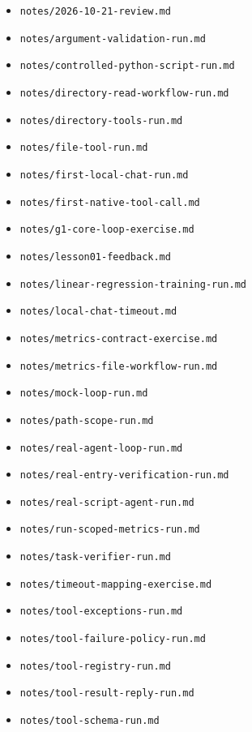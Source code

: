 \begin{itemize}
\item \nolinkurl{notes/2026-10-21-review.md}
\item \nolinkurl{notes/argument-validation-run.md}
\item \nolinkurl{notes/controlled-python-script-run.md}
\item \nolinkurl{notes/directory-read-workflow-run.md}
\item \nolinkurl{notes/directory-tools-run.md}
\item \nolinkurl{notes/file-tool-run.md}
\item \nolinkurl{notes/first-local-chat-run.md}
\item \nolinkurl{notes/first-native-tool-call.md}
\item \nolinkurl{notes/g1-core-loop-exercise.md}
\item \nolinkurl{notes/lesson01-feedback.md}
\item \nolinkurl{notes/linear-regression-training-run.md}
\item \nolinkurl{notes/local-chat-timeout.md}
\item \nolinkurl{notes/metrics-contract-exercise.md}
\item \nolinkurl{notes/metrics-file-workflow-run.md}
\item \nolinkurl{notes/mock-loop-run.md}
\item \nolinkurl{notes/path-scope-run.md}
\item \nolinkurl{notes/real-agent-loop-run.md}
\item \nolinkurl{notes/real-entry-verification-run.md}
\item \nolinkurl{notes/real-script-agent-run.md}
\item \nolinkurl{notes/run-scoped-metrics-run.md}
\item \nolinkurl{notes/task-verifier-run.md}
\item \nolinkurl{notes/timeout-mapping-exercise.md}
\item \nolinkurl{notes/tool-exceptions-run.md}
\item \nolinkurl{notes/tool-failure-policy-run.md}
\item \nolinkurl{notes/tool-registry-run.md}
\item \nolinkurl{notes/tool-result-reply-run.md}
\item \nolinkurl{notes/tool-schema-run.md}
\end{itemize}

